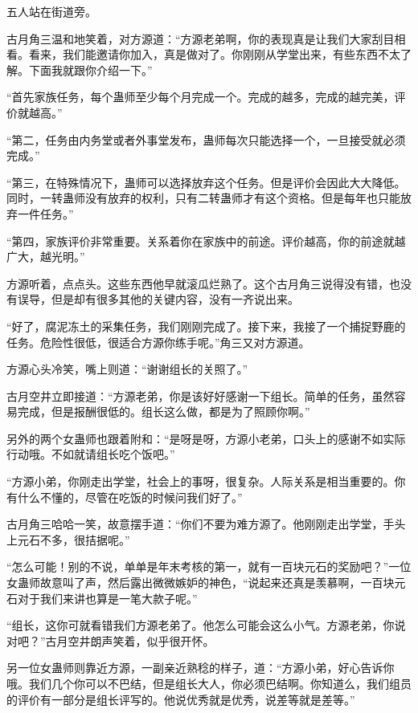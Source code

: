 
\begin{this_body}

五人站在街道旁。

古月角三温和地笑着，对方源道：“方源老弟啊，你的表现真是让我们大家刮目相看。看来，我们能邀请你加入，真是做对了。你刚刚从学堂出来，有些东西不太了解。下面我就跟你介绍一下。”

“首先家族任务，每个蛊师至少每个月完成一个。完成的越多，完成的越完美，评价就越高。”

“第二，任务由内务堂或者外事堂发布，蛊师每次只能选择一个，一旦接受就必须完成。”

“第三，在特殊情况下，蛊师可以选择放弃这个任务。但是评价会因此大大降低。同时，一转蛊师没有放弃的权利，只有二转蛊师才有这个资格。但是每年也只能放弃一件任务。”

“第四，家族评价非常重要。关系着你在家族中的前途。评价越高，你的前途就越广大，越光明。”

方源听着，点点头。这些东西他早就滚瓜烂熟了。这个古月角三说得没有错，也没有误导，但是却有很多其他的关键内容，没有一齐说出来。

“好了，腐泥冻土的采集任务，我们刚刚完成了。接下来，我接了一个捕捉野鹿的任务。危险性很低，很适合方源你练手呢。”角三又对方源道。

方源心头冷笑，嘴上则道：“谢谢组长的关照了。”

古月空井立即接道：“方源老弟，你是该好好感谢一下组长。简单的任务，虽然容易完成，但是报酬很低的。组长这么做，都是为了照顾你啊。”

另外的两个女蛊师也跟着附和：“是呀是呀，方源小老弟，口头上的感谢不如实际行动哦。不如就请组长吃个饭吧。”

“方源小弟，你刚走出学堂，社会上的事呀，很复杂。人际关系是相当重要的。你有什么不懂的，尽管在吃饭的时候问我们好了。”

古月角三哈哈一笑，故意摆手道：“你们不要为难方源了。他刚刚走出学堂，手头上元石不多，很拮据呢。”

“怎么可能！别的不说，单单是年末考核的第一，就有一百块元石的奖励吧？”一位女蛊师故意叫了声，然后露出微微嫉妒的神色，“说起来还真是羡慕啊，一百块元石对于我们来讲也算是一笔大款子呢。”

“组长，这你可就看错我们方源老弟了。他怎么可能会这么小气。方源老弟，你说对吧？”古月空井朗声笑着，似乎很开怀。

另一位女蛊师则靠近方源，一副亲近熟稔的样子，道：“方源小弟，好心告诉你哦。我们几个你可以不巴结，但是组长大人，你必须巴结啊。你知道么，我们组员的评价有一部分是组长评写的。他说优秀就是优秀，说差等就是差等。”


\end{this_body}
